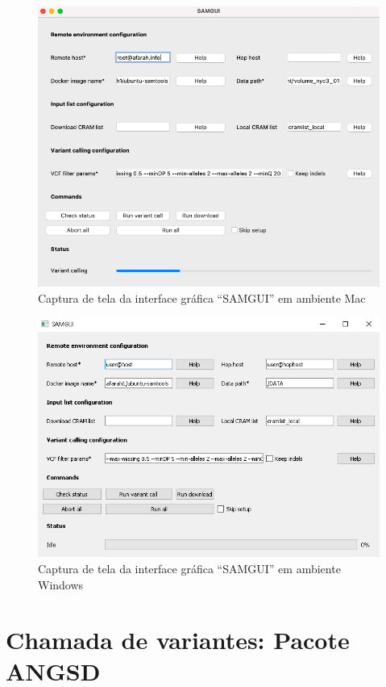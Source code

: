 \documentclass[cic,tc]{iiufrgs}
\begin{document}
\begin{figure}
  \caption{Captura de tela da interface gráfica ``SAMGUI'' em ambiente Mac}
    \begin{center}
      \includegraphics[width=0.85\linewidth]{img/samgui_mac.png}
    \end{center}
    \label{fig:samgui_mac}
\end{figure}

\begin{figure}
  \caption{Captura de tela da interface gráfica ``SAMGUI'' em ambiente Windows}
    \begin{center}
      \includegraphics[width=0.85\linewidth]{img/samgui_windows.png}
    \end{center}
    \label{fig:samgui_windows}
\end{figure}

\section{Chamada de variantes: Pacote ANGSD}
\label{sec:angsd}
\end{document}
